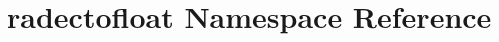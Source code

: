 \hypertarget{namespaceradectofloat}{\section{radectofloat Namespace Reference}
\label{namespaceradectofloat}
}
